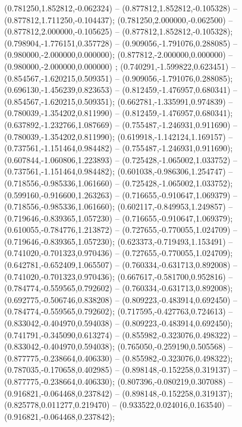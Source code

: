  (0.781250,1.852812,-0.062324) -- (0.877812,1.852812,-0.105328) -- (0.877812,1.711250,-0.104437);
 (0.781250,2.000000,-0.062500) -- (0.877812,2.000000,-0.105625) -- (0.877812,1.852812,-0.105328);
 (0.798904,-1.776151,0.357728) -- (0.909056,-1.791076,0.288085) -- (0.980000,-2.000000,0.000000);
 (0.877812,-2.000000,0.000000) -- (0.980000,-2.000000,0.000000) ;
 (0.740291,-1.599822,0.623451) -- (0.854567,-1.620215,0.509351) -- (0.909056,-1.791076,0.288085);
 (0.696130,-1.456239,0.823653) -- (0.812459,-1.476957,0.680341) -- (0.854567,-1.620215,0.509351);
 (0.662781,-1.335991,0.974839) -- (0.780039,-1.354202,0.811990) -- (0.812459,-1.476957,0.680341);
 (0.637892,-1.232766,1.087669) -- (0.755487,-1.246931,0.911690) -- (0.780039,-1.354202,0.811990);
 (0.619918,-1.142124,1.169157) -- (0.737561,-1.151464,0.984482) -- (0.755487,-1.246931,0.911690);
 (0.607844,-1.060806,1.223893) -- (0.725428,-1.065002,1.033752) -- (0.737561,-1.151464,0.984482);
 (0.601038,-0.986306,1.254747) -- (0.718556,-0.985336,1.061660) -- (0.725428,-1.065002,1.033752);
 (0.599160,-0.916600,1.263263) -- (0.716655,-0.910647,1.069379) -- (0.718556,-0.985336,1.061660);
 (0.602117,-0.849953,1.249857) -- (0.719646,-0.839365,1.057230) -- (0.716655,-0.910647,1.069379);
 (0.610055,-0.784776,1.213872) -- (0.727655,-0.770055,1.024709) -- (0.719646,-0.839365,1.057230);
 (0.623373,-0.719493,1.153491) -- (0.741020,-0.701323,0.970436) -- (0.727655,-0.770055,1.024709);
 (0.642781,-0.652409,1.065507) -- (0.760334,-0.631713,0.892008) -- (0.741020,-0.701323,0.970436);
 (0.667617,-0.581700,0.952816) -- (0.784774,-0.559565,0.792602) -- (0.760334,-0.631713,0.892008);
 (0.692775,-0.506746,0.838208) -- (0.809223,-0.483914,0.692450) -- (0.784774,-0.559565,0.792602);
 (0.717595,-0.427763,0.724613) -- (0.833042,-0.404970,0.594038) -- (0.809223,-0.483914,0.692450);
 (0.741791,-0.345090,0.613274) -- (0.855982,-0.323076,0.498322) -- (0.833042,-0.404970,0.594038);
 (0.765050,-0.259190,0.505568) -- (0.877775,-0.238664,0.406330) -- (0.855982,-0.323076,0.498322);
 (0.787035,-0.170658,0.402985) -- (0.898148,-0.152258,0.319137) -- (0.877775,-0.238664,0.406330);
 (0.807396,-0.080219,0.307088) -- (0.916821,-0.064468,0.237842) -- (0.898148,-0.152258,0.319137);
 (0.825778,0.011277,0.219470) -- (0.933522,0.024016,0.163540) -- (0.916821,-0.064468,0.237842);
